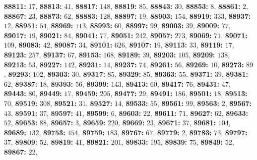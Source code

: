 \textsf{\bfseries 88811:} $17$, \textsf{\bfseries 88813:} $41$, \textsf{\bfseries 88817:} $148$, \textsf{\bfseries 88819:} $85$, \textsf{\bfseries 88843:} $30$, \textsf{\bfseries 88853:} $8$, \textsf{\bfseries 88861:} $2$, \textsf{\bfseries 88867:} $23$, \textsf{\bfseries 88873:} $62$, \textsf{\bfseries 88883:} $128$, \textsf{\bfseries 88897:} $19$, \textsf{\bfseries 88903:} $154$, \textsf{\bfseries 88919:} $333$, \textsf{\bfseries 88937:} $12$, \textsf{\bfseries 88951:} $54$, \textsf{\bfseries 88969:} $113$, \textsf{\bfseries 88993:} $60$, \textsf{\bfseries 88997:} $99$, \textsf{\bfseries 89003:} $39$, \textsf{\bfseries 89009:} $77$, \textsf{\bfseries 89017:} $19$, \textsf{\bfseries 89021:} $84$, \textsf{\bfseries 89041:} $77$, \textsf{\bfseries 89051:} $242$, \textsf{\bfseries 89057:} $273$, \textsf{\bfseries 89069:} $71$, \textsf{\bfseries 89071:} $109$, \textsf{\bfseries 89083:} $42$, \textsf{\bfseries 89087:} $34$, \textsf{\bfseries 89101:} $626$, \textsf{\bfseries 89107:} $19$, \textsf{\bfseries 89113:} $33$, \textsf{\bfseries 89119:} $17$, \textsf{\bfseries 89123:} $257$, \textsf{\bfseries 89137:} $67$, \textsf{\bfseries 89153:} $168$, \textsf{\bfseries 89189:} $39$, \textsf{\bfseries 89203:} $105$, \textsf{\bfseries 89209:} $138$, \textsf{\bfseries 89213:} $53$, \textsf{\bfseries 89227:} $142$, \textsf{\bfseries 89231:} $14$, \textsf{\bfseries 89237:} $74$, \textsf{\bfseries 89261:} $56$, \textsf{\bfseries 89269:} $10$, \textsf{\bfseries 89273:} $89$, \textsf{\bfseries 89293:} $102$, \textsf{\bfseries 89303:} $30$, \textsf{\bfseries 89317:} $85$, \textsf{\bfseries 89329:} $85$, \textsf{\bfseries 89363:} $55$, \textsf{\bfseries 89371:} $39$, \textsf{\bfseries 89381:} $62$, \textsf{\bfseries 89387:} $18$, \textsf{\bfseries 89393:} $56$, \textsf{\bfseries 89399:} $143$, \textsf{\bfseries 89413:} $60$, \textsf{\bfseries 89417:} $76$, \textsf{\bfseries 89431:} $47$, \textsf{\bfseries 89443:} $80$, \textsf{\bfseries 89449:} $17$, \textsf{\bfseries 89459:} $205$, \textsf{\bfseries 89477:} $29$, \textsf{\bfseries 89491:} $186$, \textsf{\bfseries 89501:} $18$, \textsf{\bfseries 89513:} $70$, \textsf{\bfseries 89519:} $308$, \textsf{\bfseries 89521:} $31$, \textsf{\bfseries 89527:} $14$, \textsf{\bfseries 89533:} $55$, \textsf{\bfseries 89561:} $99$, \textsf{\bfseries 89563:} $2$, \textsf{\bfseries 89567:} $43$, \textsf{\bfseries 89591:} $37$, \textsf{\bfseries 89597:} $41$, \textsf{\bfseries 89599:} $6$, \textsf{\bfseries 89603:} $22$, \textsf{\bfseries 89611:} $71$, \textsf{\bfseries 89627:} $62$, \textsf{\bfseries 89633:} $52$, \textsf{\bfseries 89653:} $88$, \textsf{\bfseries 89657:} $3$, \textsf{\bfseries 89659:} $220$, \textsf{\bfseries 89669:} $23$, \textsf{\bfseries 89671:} $37$, \textsf{\bfseries 89681:} $104$, \textsf{\bfseries 89689:} $132$, \textsf{\bfseries 89753:} $454$, \textsf{\bfseries 89759:} $183$, \textsf{\bfseries 89767:} $67$, \textsf{\bfseries 89779:} $2$, \textsf{\bfseries 89783:} $73$, \textsf{\bfseries 89797:} $37$, \textsf{\bfseries 89809:} $52$, \textsf{\bfseries 89819:} $41$, \textsf{\bfseries 89821:} $201$, \textsf{\bfseries 89833:} $195$, \textsf{\bfseries 89839:} $75$, \textsf{\bfseries 89849:} $52$, \textsf{\bfseries 89867:} $22$, 
